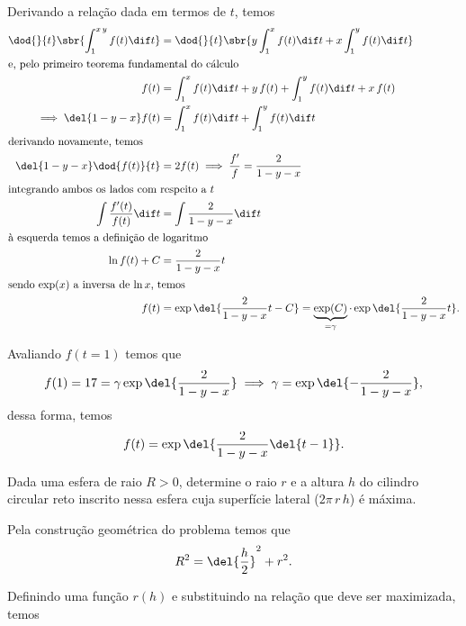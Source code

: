 \documentclass{IMTexam}
\begin{document}
\begin{questions}
		\begin{solution}
			Derivando a relação dada em termos de $ t $, temos
			\begin{align*}
				\dod{}{t}\sbr{\int_{1}^{x\,y}f(t)\dif t}&=\dod{}{t}\sbr{y\int_{1}^{x}f(t)\dif t+x\int_{1}^{y}f(t)\dif t}\\
				\intertext{e, pelo primeiro teorema fundamental do cálculo}
				f(t)&=\int_{1}^{x}f(t)\dif t+y\,f(t)+\int_{1}^{y}f(t)\dif t+x\,f(t)\\
				\implies\del{1-y-x}f(t)&=\int_{1}^{x}f(t)\dif t+\int_{1}^{y}f(t)\dif t\\
				\intertext{derivando novamente, temos}
				\del{1-y-x}\dod{f(t)}{t}&=2f(t)\implies \dfrac{f'}{f}=\dfrac{2}{1-y-x}\\
				\intertext{integrando ambos os lados com respeito a $ t $}
				\int\dfrac{f'(t)}{f(t)}\dif t&=\int\dfrac{2}{1-y-x}\dif t\\
				\intertext{à esquerda temos a definição de logaritmo}
				\ln f(t)+C&=\dfrac{2}{1-y-x}t\\
				\intertext{sendo $ \exp(x) $ a inversa de $ \ln x $, temos}
				f(t)&=\exp\del{\dfrac{2}{1-y-x}t-C}=\underbrace{\exp(C)}_{=\gamma}\cdot\exp\del{\dfrac{2}{1-y-x}t}.
			\end{align*}
			
			 Avaliando $ f(t=1) $ temos que
			 \[ f(1)=17=\gamma\exp\del{\dfrac{2}{1-y-x}}\implies\gamma=\exp\del{-\dfrac{2}{1-y-x}}, \]
			 dessa forma, temos
			 \[ f(t)=\exp\del{\dfrac{2}{1-y-x}\del{t-1}}. \]
		\end{solution}
		
		\question Dada uma esfera de raio $ R>0 $, determine o raio $ r $ e a altura $ h $ do cilindro circular reto inscrito nessa esfera cuja superfície lateral ($ 2\pi\,r\,h $) é máxima.
		
		\begin{solution}
			
			\begin{multi}
				
				Pela construção geométrica do problema temos que
				\begin{equation}\label{eq:pit}
					R^{2}=\del{\dfrac{h}{2}}^{2}+r^{2}.
				\end{equation}
			
				Definindo uma função $ r(h) $ e substituindo na relação que deve ser maximizada, temos
				

\end{multi}
\end{solution}
\end{questions}
\end{document}
